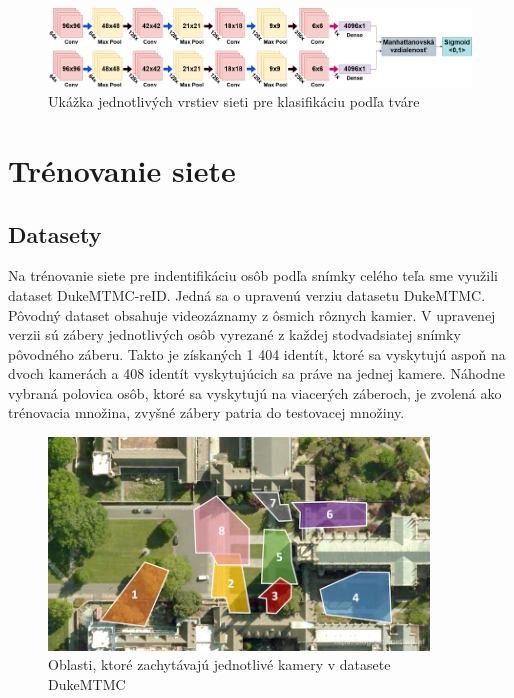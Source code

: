 \begin{figure}[H]
\centerline{\includegraphics[width=1\textwidth]{images/siamese_architecture}}
\caption[Architektúra siete pre klasifikácia tváre]{Ukážka jednotlivých vrstiev sieti pre klasifikáciu podľa tváre}
\label{obr:siamese_architecture}
\end{figure}

\section{Trénovanie siete}
\subsection{Datasety}
Na trénovanie siete pre indentifikáciu osôb podľa snímky celého teľa sme využili dataset DukeMTMC-reID.
Jedná sa o upravenú verziu datasetu DukeMTMC.
Pôvodný dataset obsahuje videozáznamy z ôsmich rôznych kamier.
V upravenej verzii sú zábery jednotlivých osôb vyrezané z každej stodvadsiatej snímky pôvodného záberu.
Takto je získaných 1 404 identít, ktoré sa vyskytujú aspoň na dvoch kamerách a 408 identít vyskytujúcich sa práve na jednej kamere.
Náhodne vybraná polovica osôb, ktoré sa vyskytujú na viacerých záberoch, je zvolená ako trénovacia množina, zvyšné zábery patria do testovacej množiny.

\begin{figure}[H]
\centerline{\includegraphics[width=0.9\textwidth]{images/duke_topology}}
\caption[Topológia kamier]{Oblasti, ktoré zachytávajú jednotlivé kamery v datasete DukeMTMC}
\label{obr:duke_topology}
\end{figure}

